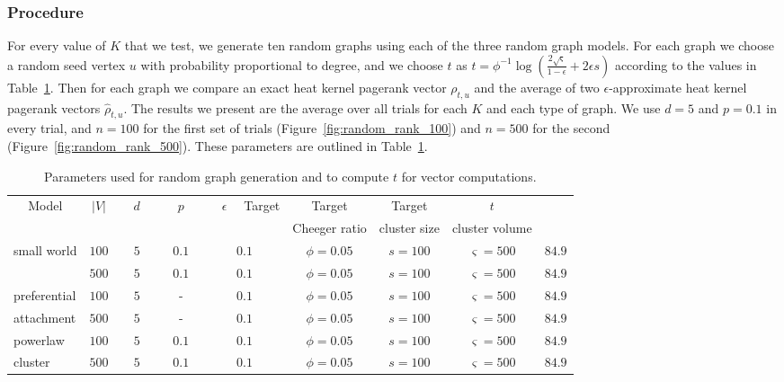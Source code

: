 \documentclass[runningheads,a4paper]{llncs}
\newcommand{\tparamcluster}{\phi^{-1}\log(\frac{2\sqrt{\varsigma}}{1-\epsilon} + 2\epsilon s)}
\begin{document}
\subsubsection{Procedure} For every value of $K$ that we test, we generate ten
random graphs using each of the three random graph models.  For each graph we
choose a random seed vertex $u$ with probability proportional to degree, and we
choose $t$ as $t=\tparamcluster$ according to the values in
Table~\ref{table:synthrankingparams}.  Then for each graph we compare an exact
heat kernel pagerank vector $\rho_{t,u}$ and the average of two
$\epsilon$-approximate heat kernel pagerank vectors $\hat{\rho}_{t,u}$.  The results
we present are the average over all trials for each $K$ and each type of graph.
We use $d=5$ and $p=0.1$ in every trial, and $n=100$ for the first set of trials
(Figure~\ref{fig:random_rank_100}) and $n=500$ for the second
(Figure~\ref{fig:random_rank_500}).  These parameters are outlined in
Table~\ref{table:synthrankingparams}.

\begin{table}
\centering
\begin{tabular}{|p{2cm}|c|c|c|c|c|c|c|c|}
\hline
\multicolumn{1}{|c|}{Model} & $|V|$ & ~~$d$~~ & ~~$p$~~ & ~~$\epsilon$~~ 
Target & Target & Target & $t$\\
 & & & & & Cheeger ratio & cluster size & cluster volume &\\
\hline\hline
small world  & $100$ & $5$ & $0.1$ & $0.1$ & $\phi = 0.05$ & $s = 100$ & $\varsigma = 500$ & $84.9$\\
             & $500$ & $5$ & $0.1$ & $0.1$ & $\phi = 0.05$ & $s = 100$ &
$\varsigma = 500$ & $84.9$\\\hline
preferential & $100$ & $5$ & - & $0.1$ & $\phi = 0.05$ & $s = 100$ & $\varsigma = 500$ & $84.9$\\
attachment   & $500$ & $5$ & - & $0.1$ & $\phi = 0.05$ & $s = 100$ &
$\varsigma = 500$ & $84.9$\\\hline
powerlaw     & $100$ & $5$ & $0.1$ & $0.1$ & $\phi = 0.05$ & $s = 100$ & $\varsigma = 500$ & $84.9$\\
cluster      & $500$ & $5$ & $0.1$ & $0.1$ & $\phi = 0.05$ & $s = 100$ &
$\varsigma = 500$ & $84.9$\\
\hline
\end{tabular}
\caption{Parameters used for random graph generation and to compute $t$ for vector computations.}
\label{table:synthrankingparams} 
\end{table}
\end{document}
